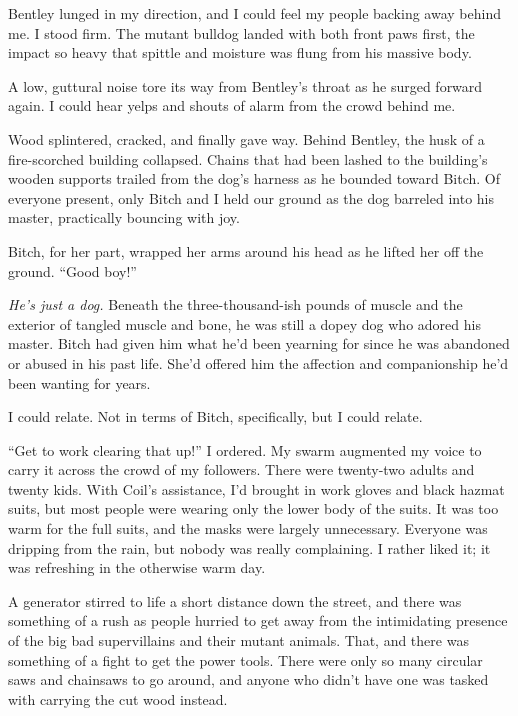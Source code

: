 





Bentley lunged in my direction, and I could feel my people backing away behind me.  I stood firm.  The mutant bulldog landed with both front paws first, the impact so heavy that spittle and moisture was flung from his massive body.



A low, guttural noise tore its way from Bentley's throat as he surged forward again.  I could hear yelps and shouts of alarm from the crowd behind me.



Wood splintered, cracked, and finally gave way.  Behind Bentley, the husk of a fire-scorched building collapsed.  Chains that had been lashed to the building's wooden supports trailed from the dog's harness as he bounded toward Bitch.  Of everyone present, only Bitch and I held our ground as the dog barreled into his master, practically bouncing with joy.



Bitch, for her part, wrapped her arms around his head as he lifted her off the ground.  ``Good boy!''



\emph{He's just a dog.  }Beneath the three-thousand-ish pounds of muscle and the exterior of tangled muscle and bone, he was still a dopey dog who adored his master.  Bitch had given him what he'd been yearning for since he was abandoned or abused in his past life.  She'd offered him the affection and companionship he'd been wanting for years.



I could relate.  Not in terms of Bitch, specifically, but I could relate.



``Get to work clearing that up!'' I ordered.  My swarm augmented my voice to carry it across the crowd of my followers.  There were twenty-two adults and twenty kids.  With Coil's assistance, I'd brought in work gloves and black hazmat suits, but most people were wearing only the lower body of the suits.  It was too warm for the full suits, and the masks were largely unnecessary.  Everyone was dripping from the rain, but nobody was really complaining.  I rather liked it; it was refreshing in the otherwise warm day.



A generator stirred to life a short distance down the street, and there was something of a rush as people hurried to get away from the intimidating presence of the big bad supervillains and their mutant animals.  That, and there was something of a fight to get the power tools.  There were only so many circular saws and chainsaws to go around, and anyone who didn't have one was tasked with carrying the cut wood instead.



